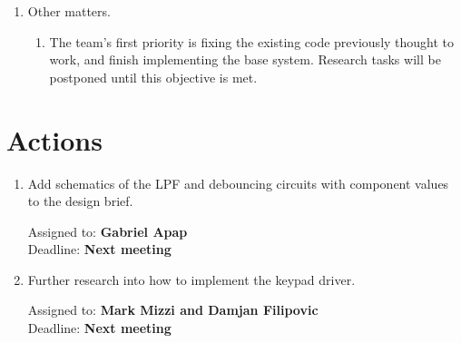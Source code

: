 \documentclass[11pt,a4paper]{scrartcl}
\begin{document}
\begin{enumerate}
    \item Other matters.
        \begin{enumerate}
            \item The team's first priority is fixing the existing code previously thought to work, and finish implementing the base system. Research tasks will be postponed until this objective is met.
        \end{enumerate}

\end{enumerate}

\section*{Actions}

\begin{enumerate}

\item Add schematics of the LPF and debouncing circuits with component values to the design brief.
\begin{flushright}
Assigned to: \textbf{Gabriel Apap} \\
Deadline: \textbf{Next meeting}
\end{flushright}

\item Further research into how to implement the keypad driver.
\begin{flushright}
Assigned to: \textbf{Mark Mizzi and Damjan Filipovic} \\
Deadline: \textbf{Next meeting}
\end{flushright}


\end{enumerate}
\end{document}
